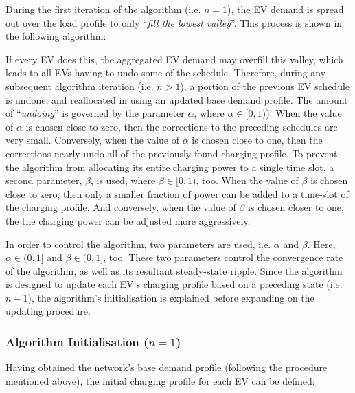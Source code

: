During the first iteration of the algorithm (i.e. $n=1$), the EV demand is spread out over the load profile to only ``\textit{fill the lowest valley}''.
This process is shown in the following algorithm:



If every EV does this, the aggregated EV demand may overfill this valley, which leads to all EVs having to undo some of the schedule.
Therefore, during any subsequent algorithm iteration (i.e. $n>1$), a portion of the previous EV schedule is undone, and reallocated in using an updated base demand profile.
The amount of ``\textit{undoing}'' is governed by the parameter $\alpha$, where $\alpha \in [0, 1)$).
When the value of $\alpha$ is chosen close to zero, then the corrections to the preceding schedules are very small.
Conversely, when the value of $\alpha$ is chosen close to one, then the corrections nearly undo all of the previously found charging profile.
To prevent the algorithm from allocating its entire charging power to a single time slot, a second parameter, $\beta$, is used, where $\beta \in [0, 1)$, too.
When the value of $\beta$ is chosen close to zero, then only a smaller fraction of power can be added to a time-slot of the charging profile.
And conversely, when the value of $\beta$ is chosen closer to one, the the charging power can be adjusted more aggressively.



In order to control the algorithm, two parameters are used, i.e. $\alpha$ and $\beta$.
Here, $\alpha \in (0, 1]$ and $\beta \in (0, 1]$, too.
These two parameters control the convergence rate of the algorithm, as well as its resultant steady-state ripple.
Since the algorithm is designed to update each EV's charging profile based on a preceding state (i.e. $n-1$), the algorithm's initialisation is explained before expanding on the updating procedure.

\subsubsection{Algorithm Initialisation ($n=1$)}

Having obtained the network's base demand profile (following the procedure mentioned above), the initial charging profile for each EV can be defined:














